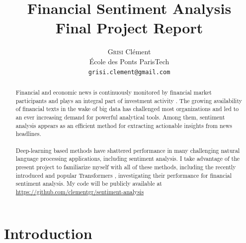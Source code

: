 \documentclass[final]{cvpr}
\begin{document}
	
\title{Financial Sentiment Analysis\\
	\vspace{2mm}
	\large \normalfont Final Project Report}

\author{\textsc{Grisi} Clément\\
	École des Ponts ParisTech\\
	{\tt\small grisi.clement@gmail.com}
}

\maketitle

\begin{abstract}
	Financial and economic news is continuously monitored by financial market participants and plays an integral part of investment activity \cite{headlines}. The growing availability of financial texts in the wake of big data has challenged most organizations and led to an ever increasing demand for powerful analytical tools. Among them, sentiment analysis appears as an efficient method for extracting actionable insights from news headlines. \\
	\\Deep-learning based methods have shattered performance in many challenging natural language processing applications, including sentiment analysis. I take advantage of the present project to familiarize myself with all of these methods, including the recently introduced and popular Transformers \cite{transformer}, investigating their performance for financial sentiment analysis. My code will be publicly available at \small{\url{https://github.com/clementgr/sentiment-analysis}}
\end{abstract}

\section{Introduction}
\end{document}
